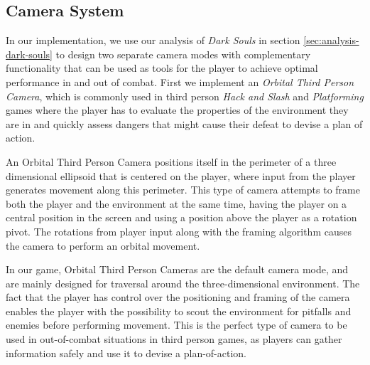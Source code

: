 \subsection{Camera System}
\label{sec:lock-on-camera}

In our implementation, we use our analysis of \emph{Dark Souls} in section \ref{sec:analysis-dark-souls} to design two separate camera modes with complementary functionality that can be used as tools for the player to achieve optimal performance in and out of combat. First we implement an \emph{Orbital Third Person Camera}, which is commonly used in third person \emph{Hack and Slash} and \emph{Platforming} games where the player has to evaluate the properties of the environment they are in and quickly assess dangers that might cause their defeat to devise a plan of action.

An Orbital Third Person Camera positions itself in the perimeter of a three dimensional ellipsoid that is centered on the player, where input from the player generates movement along this perimeter. This type of camera attempts to frame both the player and the environment at the same time, having the player on a central position in the screen and using a position above the player as a rotation pivot. The rotations from player input along with the framing algorithm causes the camera to perform an orbital movement.

In our game, Orbital Third Person Cameras are the default camera mode, and are mainly designed for traversal around the three-dimensional environment. The fact that the player has control over the positioning and framing of the camera enables the player with the possibility to scout the environment for pitfalls and enemies before performing movement. This is the perfect type of camera to be used in out-of-combat situations in third person games, as players can gather information safely and use it to devise a plan-of-action.

